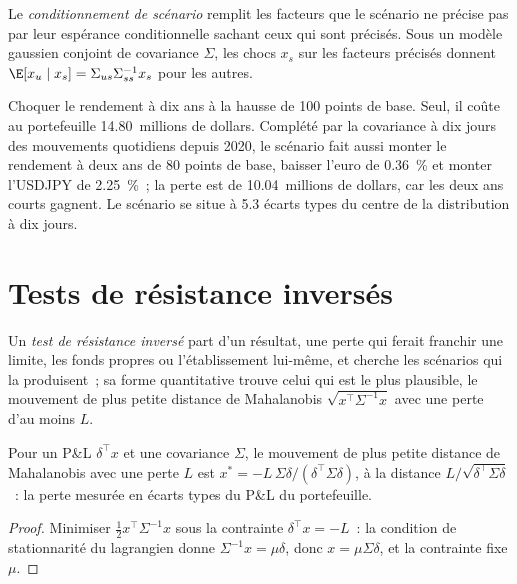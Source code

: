 \begin{definition}\label{def:rc:stress-testing-and-scenarios:conditioning}
Le \emph{conditionnement de scénario} remplit les facteurs que le scénario ne précise
pas par leur espérance conditionnelle sachant ceux qui sont précisés. Sous un modèle gaussien conjoint de covariance $\Sigma$, les chocs $x_s$
sur les facteurs précisés donnent $\E[x_u\mid x_s] = \Sigma_{us}\Sigma_{ss}^{-1}x_s$ pour les
autres.
\end{definition}

\label{lst:rc:stress-testing-and-scenarios:condition}

\begin{example}\label{ex:rc:stress-testing-and-scenarios:hypo}
Choquer le rendement à dix ans à la hausse de 100 points de base. Seul, il coûte au portefeuille 14.80~millions de dollars. Complété
par la covariance à dix jours des mouvements quotidiens depuis 2020, le scénario fait aussi monter le rendement à deux ans de 80
points de base, baisser l'euro de 0.36~\% et monter l'USDJPY de 2.25~\%~; la perte est de 10.04~millions de dollars, car les
deux ans courts gagnent. Le scénario se situe à 5.3 écarts types du centre de la
distribution à dix jours.
\end{example}

\section{Tests de résistance inversés}

\begin{definition}\label{def:rc:stress-testing-and-scenarios:reverse}
Un \emph{test de résistance inversé} part d'un résultat, une perte qui ferait franchir une limite,
les fonds propres ou l'établissement lui-même, et cherche les scénarios qui la produisent~; sa forme quantitative trouve
celui qui est le plus plausible, le mouvement de plus petite distance de Mahalanobis
$\sqrt{x^\top\Sigma^{-1}x}$ avec une perte d'au moins $L$.
\end{definition}

\begin{proposition}\label{prop:rc:stress-testing-and-scenarios:rev}
Pour un P\&L $\delta^\top x$ et une covariance $\Sigma$, le mouvement de plus petite distance de Mahalanobis avec une perte $L$ est
$x^* = -L\,\Sigma\delta/(\delta^\top\Sigma\delta)$, à la distance $L/\sqrt{\delta^\top\Sigma\delta}$~: la perte mesurée en écarts types
du P\&L du portefeuille.
\end{proposition}
\begin{proof}
Minimiser $\tfrac12x^\top\Sigma^{-1}x$ sous la contrainte $\delta^\top x = -L$~: la condition de stationnarité du lagrangien donne $\Sigma^{-1}x = \mu\delta$,
donc $x = \mu\Sigma\delta$, et la contrainte fixe $\mu$.
\end{proof}

